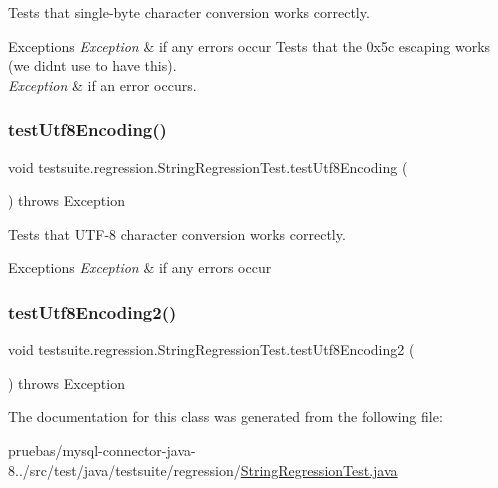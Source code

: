 Tests that single-\/byte character conversion works correctly.


\begin{DoxyExceptions}{Exceptions}
{\em Exception} & if any errors occur Tests that the 0x5c escaping works (we didn\textquotesingle{}t use to have this).\\
\hline
{\em Exception} & if an error occurs. \\
\hline
\end{DoxyExceptions}
\mbox{\label{classtestsuite_1_1regression_1_1_string_regression_test_a4f3f125a39d60c4abe46d69db6002ede}} 
\subsubsection{\texorpdfstring{test\+Utf8\+Encoding()}{testUtf8Encoding()}}
{\footnotesize\ttfamily void testsuite.\+regression.\+String\+Regression\+Test.\+test\+Utf8\+Encoding (\begin{DoxyParamCaption}{ }\end{DoxyParamCaption}) throws Exception}

Tests that U\+T\+F-\/8 character conversion works correctly.


\begin{DoxyExceptions}{Exceptions}
{\em Exception} & if any errors occur \\
\hline
\end{DoxyExceptions}
\mbox{\label{classtestsuite_1_1regression_1_1_string_regression_test_a7029c28b203cd6e7cb1b64d78f8d1c26}} 
\subsubsection{\texorpdfstring{test\+Utf8\+Encoding2()}{testUtf8Encoding2()}}
{\footnotesize\ttfamily void testsuite.\+regression.\+String\+Regression\+Test.\+test\+Utf8\+Encoding2 (\begin{DoxyParamCaption}{ }\end{DoxyParamCaption}) throws Exception}



The documentation for this class was generated from the following file\+:\begin{DoxyCompactItemize}
\item 
pruebas/mysql-\/connector-\/java-\/8../src/test/java/testsuite/regression/\mbox{\hyperlink{_string_regression_test_8java}{String\+Regression\+Test.\+java}}\end{DoxyCompactItemize}
